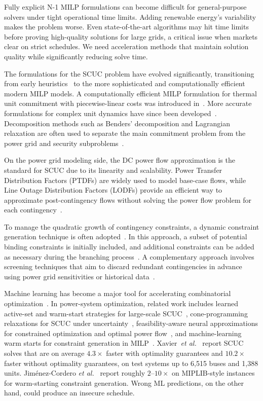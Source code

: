 \documentclass[runningheads]{llncs}
\begin{document}
Fully explicit N-1 MILP formulations can become difficult for general-purpose solvers under tight operational time limits. Adding renewable energy's variability makes the problem worse. Even state-of-the-art algorithms may hit time limits before proving high-quality solutions for large grids, a critical issue when markets clear on strict schedules. We need acceleration methods that maintain solution quality while significantly reducing solve time.

The formulations for the SCUC problem have evolved significantly, transitioning from early heuristics~\cite{Merlin1983} to the more sophisticated and computationally efficient modern MILP models. A computationally efficient MILP formulation for thermal unit commitment with piecewise-linear costs was introduced in~\cite{Carrion2006}. More accurate formulations for complex unit dynamics have since been developed~\cite{Ostrowski2012}. Decomposition methods such as Benders' decomposition and Lagrangian relaxation are often used to separate the main commitment problem from the power grid and security subproblems~\cite{Morales2013}.


On the power grid modeling side, the DC power flow approximation is the standard for SCUC due to its linearity and scalability. Power Transfer Distribution Factors (PTDFs) are widely used to model base-case flows, while Line Outage Distribution Factors (LODFs) provide an efficient way to approximate post-contingency flows without solving the power flow problem for each contingency~\cite{Christie2000, Tejada2018}.

To manage the quadratic growth of contingency constraints, a dynamic constraint generation technique is often adopted~\cite{Tejada2018}.
In this approach, a subset of potential binding constraints is initially included, and additional constraints can be added as necessary during the branching process~\cite{Tejada2018}. A complementary approach involves screening techniques that aim to discard redundant contingencies in advance using power grid sensitivities or historical data~\cite{Holzer2024}.

Machine learning has become a major tool for accelerating combinatorial optimization~\cite{Bengio2021}. In power-system optimization, related work includes learned active-set and warm-start strategies for large-scale SCUC~\cite{Xavier2019}, cone-programming relaxations for SCUC under uncertainty~\cite{Quarm2021}, feasibility-aware neural approximations for constrained optimization and optimal power flow~\cite{Donti2021}, and machine-learning warm starts for constraint generation in MILP~\cite{JimenezCordero2022}. Xavier~\textit{et al.}~\cite{Xavier2019} report SCUC solves that are on average $4.3\times$ faster with optimality guarantees and $10.2\times$ faster without optimality guarantees, on test systems up to 6{,}515 buses and 1{,}388 units. Jim{\'e}nez-Cordero \textit{et al.}~\cite{JimenezCordero2022} report roughly $2$--$10\times$ on MIPLIB-style instances for warm-starting constraint generation. Wrong ML predictions, on the other hand, could produce an insecure schedule.
\end{document}
